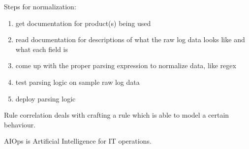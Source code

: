\documentclass[11pt]{article}
\begin{document}
Steps for normalization:
\begin{enumerate}
\item get documentation for product(s) being used
\item read documentation for descriptions of what the raw log data looks like and what each field is
\item come up with the proper parsing expression to normalize data, like regex
\item test parsing logic on sample raw log data
\item deploy parsing logic
\end{enumerate}

Rule correlation deals with crafting a rule which is able to model a certain behaviour.

AIOps is Artificial Intelligence for IT operations.
\end{document}
